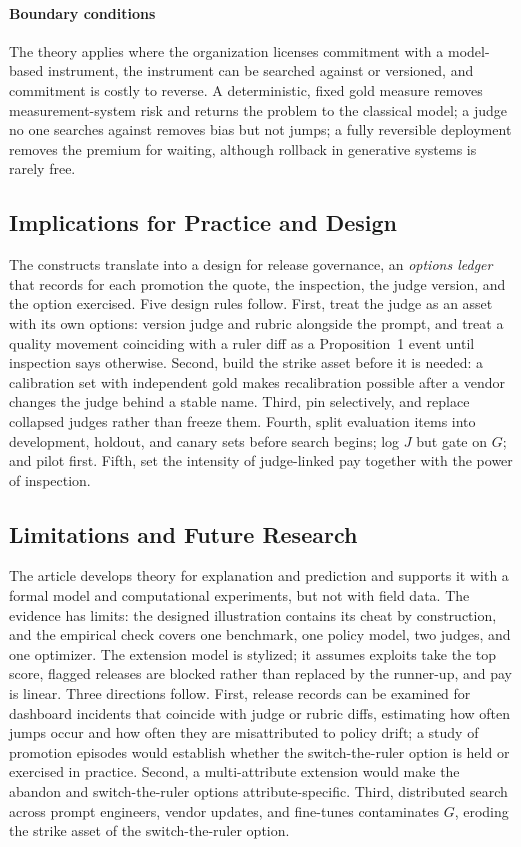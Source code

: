 \documentclass[acmsmall,screen,review,anonymous]{acmart}
\theoremstyle{acmdefinition}
\begin{document}
\paragraph{Boundary conditions} The theory applies where the organization licenses commitment with a model-based instrument, the instrument can be searched against or versioned, and commitment is costly to reverse. A deterministic, fixed gold measure removes measurement-system risk and returns the problem to the classical model; a judge no one searches against removes bias but not jumps; a fully reversible deployment removes the premium for waiting, although rollback in generative systems is rarely free.

\subsection{Implications for Practice and Design}

The constructs translate into a design for release governance, an \emph{options ledger} that records for each promotion the quote, the inspection, the judge version, and the option exercised. Five design rules follow. First, treat the judge as an asset with its own options: version judge and rubric alongside the prompt, and treat a quality movement coinciding with a ruler diff as a Proposition~1 event until inspection says otherwise. Second, build the strike asset before it is needed: a calibration set with independent gold makes recalibration possible after a vendor changes the judge behind a stable name. Third, pin selectively, and replace collapsed judges rather than freeze them. Fourth, split evaluation items into development, holdout, and canary sets before search begins; log $J$ but gate on $G$; and pilot first. Fifth, set the intensity of judge-linked pay together with the power of inspection.

\subsection{Limitations and Future Research}

The article develops theory for explanation and prediction \citep{gregor2006} and supports it with a formal model and computational experiments, but not with field data. The evidence has limits: the designed illustration contains its cheat by construction, and the empirical check covers one benchmark, one policy model, two judges, and one optimizer. The extension model is stylized; it assumes exploits take the top score, flagged releases are blocked rather than replaced by the runner-up, and pay is linear. Three directions follow. First, release records can be examined for dashboard incidents that coincide with judge or rubric diffs, estimating how often jumps occur and how often they are misattributed to policy drift; a study of promotion episodes would establish whether the switch-the-ruler option is held or exercised in practice. Second, a multi-attribute extension would make the abandon and switch-the-ruler options attribute-specific. Third, distributed search across prompt engineers, vendor updates, and fine-tunes contaminates $G$, eroding the strike asset of the switch-the-ruler option.
\end{document}
